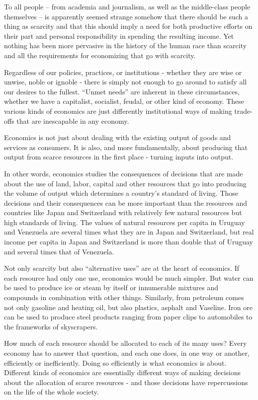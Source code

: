 To all people – from academia and journalism, as well as the middle-class people themselves – is apparently seemed strange somehow that there should be such a thing as scarcity and that this should imply a need for both productive efforts on their part and personal responsibility in spending the resulting income. Yet nothing has been more pervasive in the history of the human race than scarcity and all the requirements for economizing that go with scarcity.

Regardless of our policies, practices, or institutions - whether they are wise or unwise, noble or ignoble - there is simply not enough to go around to satisfy all our desires to the fullest. ``Unmet needs'' are inherent in these circumstances, whether we have a capitalist, socialist, feudal, or other kind of economy. These various kinds of economics are just differently institutional ways of making trade-offs that are inescapable in any economy.

Economics is not just about dealing with the existing output of goods and services as consumers. It is also, and more fundamentally, about producing that output from scarce resources in the first place - turning inputs into output.

In other words, economics studies the consequences of decisions that are made about the use of land, labor, capital and other resources that go into producing the volume of output which determines a country’s standard of living. Those decisions and their consequences can be more important than the resources and countries like Japan and Switzerland with relatively few natural resources but high standards of living. The values of natural resources per capita in Uruguay and Venezuela are several times what they are in Japan and Switzerland, but real income per capita in Japan and Switzerland is more than double that of Uruguay and several times that of Venezuela.

Not only scarcity but also ``alternative uses'' are at the heart of economics. If each resource had only one use, economics would be much simpler. But water can be used to produce ice or steam by itself or innumerable mixtures and compounds in combination with other things. Similarly, from petroleum comes not only gasoline and heating oil, but also plastics, asphalt and Vaseline. Iron ore can be used to produce steel products ranging from paper clips to automobiles to the frameworks of skyscrapers.

How much of each resource should be allocated to each of its many uses?  Every economy has to answer that question, and each one does, in one way or another, efficiently or inefficiently. Doing so efficiently is what economics is about. Different kinds of economics are essentially different ways of making decisions about the allocation of scarce resources - and those decisions have repercussions on the life of the whole society.

